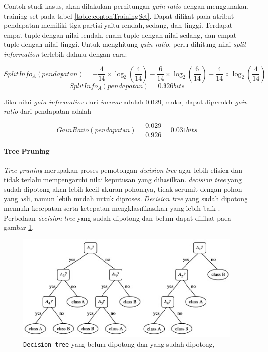 Contoh studi kasus, akan dilakukan perhitungan \textsl{gain ratio} dengan menggunakan training set pada tabel \ref{table:contohTrainingSet}. Dapat dilihat pada atribut pendapatan memiliki tiga partisi yaitu rendah, sedang, dan tinggi. Terdapat empat tuple dengan nilai rendah, enam tuple dengan nilai sedang, dan empat tuple dengan nilai tinggi. Untuk menghitung \textsl{gain ratio}, perlu dihitung nilai \textsl{split information} terlebih dahulu dengan cara:

\begin{displaymath}
	SplitInfo_A(pendapatan) = - \frac{4}{14} \times \log_2 (\frac{4}{14}) - \frac{6}{14} \times \log_2 (\frac{6}{14}) - \frac{4}{14} \times \log_2 (\frac{4}{14})
\end{displaymath} 
\begin{displaymath}
	SplitInfo_A(pendapatan) = 0.926 bits
\end{displaymath} 

Jika nilai \textsl{gain information} dari \textsl{income} adalah 0.029, maka, dapat diperoleh \textsl{gain ratio} dari pendapatan adalah

\begin{displaymath}
	GainRatio(pendapatan) = \frac{0.029}{0.926} = 0.031 bits
\end{displaymath}

\paragraph{Tree Pruning}
	
\textsl{Tree pruning} merupakan proses pemotongan \textsl{decision tree} agar lebih efisien dan tidak terlalu mempengaruhi nilai keputusan yang dihasilkan. \textsl{decision tree} yang sudah dipotong akan lebih kecil ukuran pohonnya, tidak serumit dengan pohon yang asli, namun lebih mudah untuk diproses. \textsl{Decision tree} yang sudah dipotong memiliki kecepatan serta ketepatan mengklasifikasikan yang lebih baik \cite{DM}. Perbedaan \textsl{decision tree} yang sudah dipotong dan belum dapat dilihat pada gambar \ref{fig:treePruning}.

\begin{figure}
\includegraphics[scale=1]{Gambar/treepruning.jpg}
\caption[\texttt{Decision Tree Pruned}]{\texttt{Decision tree} yang belum dipotong dan yang sudah dipotong, \cite{DM}} 
\label{fig:treePruning}
\end{figure}


